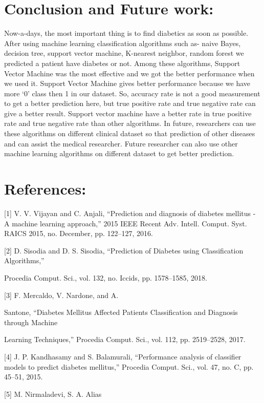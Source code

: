 \documentclass[conference]{IEEEtran}
\begin{document}
\section{Conclusion and Future work:}
	
	Now-a-days, the most important thing is to find diabetics as soon as possible. After using machine learning classification algorithms such as- naive Bayes, decision tree, support vector machine, K-nearest neighbor, random forest we predicted a patient have diabetes or not. Among these algorithms, Support Vector Machine was the most effective and we got the better performance when we used it. Support Vector Machine gives better performance because we have more ‘0’ class then 1 in our dataset. So, accuracy rate is not a good measurement to get a better prediction here, but true positive rate and true negative rate can give a better result. Support vector machine have a better rate in true positive rate and true negative rate than other algorithms. In future, researchers can use these algorithms on different clinical dataset so that prediction of other diseases and can assist the medical researcher. Future researcher can also use other machine learning algorithms on different dataset to get better prediction.
	
\section{References:}
	[1]	V. V. Vijayan and C. Anjali, “Prediction and diagnosis of diabetes mellitus - A machine learning approach,” 2015 IEEE Recent Adv. Intell. Comput. Syst. RAICS 2015, no. December, pp. 122–127, 2016.
	
	[2]	D. Sisodia and D. S. Sisodia, “Prediction of Diabetes using Classification Algorithms,”
	
	Procedia Comput. Sci., vol. 132, no. Iccids, pp. 1578–1585, 2018.
	
	[3]	F.  Mercaldo,  V.  Nardone,  and  A.
	
	Santone,  “Diabetes  Mellitus  Affected  Patients
	Classification  and  Diagnosis  through  Machine
	
	Learning Techniques,” Procedia Comput. Sci., vol. 112, pp. 2519–2528, 2017.
	
	[4]	J. P. Kandhasamy and S. Balamurali, “Performance analysis of classifier models to predict diabetes mellitus,” Procedia Comput. Sci., vol. 47, no. C, pp. 45–51, 2015.
	
	[5]	M.	Nirmaladevi,	S.	A.	Alias
	
\end{document}
